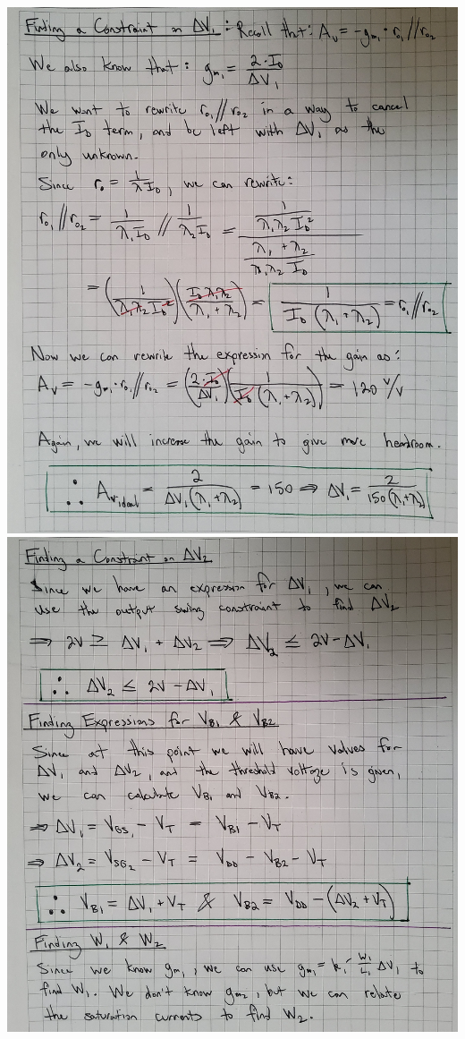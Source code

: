 \documentclass[12pt, fleqn]{article}
\begin{document}
\newpage
\includegraphics[scale=0.165, angle=90, center]{p2a_4.jpg}\\
\newpage
\includegraphics[scale=0.165, angle=90, center]{p2a_5.jpg}\\
\end{document}
